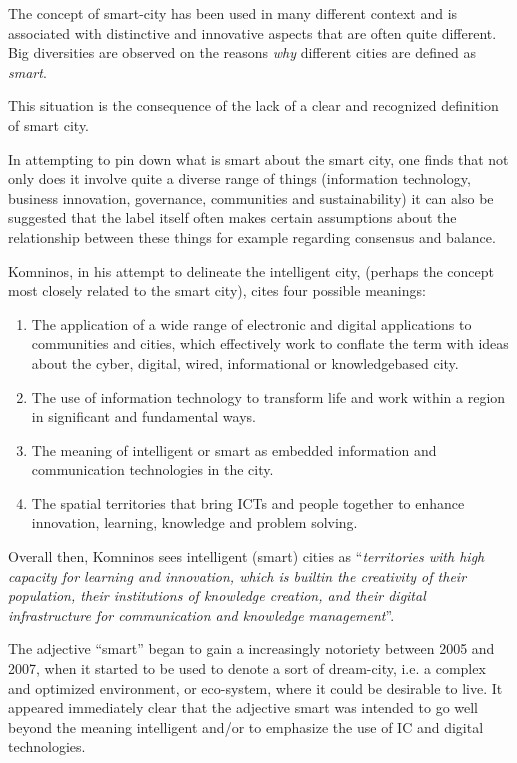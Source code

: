 The concept of smart-city has been used in many different context and is associated with distinctive and innovative aspects that are often quite different. Big diversities are observed on the reasons \textit{why} different cities are defined as \textit{smart}.

This situation is the consequence of the lack of a clear and recognized definition of smart city.

In attempting to pin down what is smart about the smart city, one finds that not only does it involve quite a diverse range of things (information technology, business innovation, governance, communities and sustainability) it can also be suggested that the label itself often makes certain assumptions about the relationship between these things for example regarding consensus and balance\cite{hollands_will_2008}.

Komninos\cite{komninos_intelligent_2002}, in his attempt to delineate the intelligent city, (perhaps the concept most closely related to the smart city), cites four possible meanings:

\begin{enumerate}
\item The application of a wide range of electronic and digital applications to communities and cities, which effectively work to conflate the term with ideas about the cyber, digital, wired, informational or knowledge\textendash based city.
\item The use of information technology to transform life and work within a region in significant and fundamental ways.
\item The meaning of intelligent or smart as embedded information and communication technologies in the city.
\item The spatial territories that bring ICTs and people together to enhance innovation, learning, knowledge and problem solving.
\end{enumerate}

Overall then, Komninos\cite{komninos_intelligent_2002} sees intelligent (smart) cities as ``\textit{territories with high capacity for learning and innovation, which is built\textendash in the creativity of their population, their institutions of knowledge creation, and their digital infrastructure for communication and knowledge management}''.

The adjective ``smart'' began to gain a increasingly notoriety between 2005 and 2007, when it started to be used to denote a sort of dream-city, i.e. a complex and optimized environment, or eco-system, where it could be desirable to live. It appeared immediately clear that the adjective smart was intended to go well beyond the meaning intelligent and/or to emphasize the use of IC and digital technologies\cite{giovannella_smart_2014-1}.

